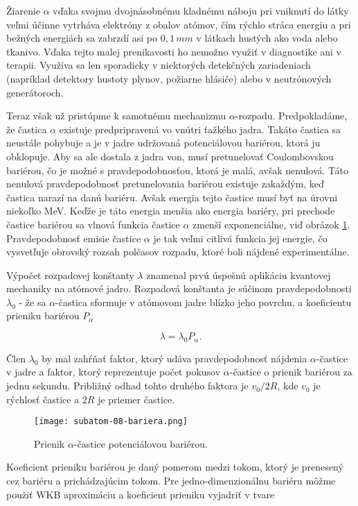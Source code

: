 \documentclass[../../main.tex]{subfiles}
\begin{document}
Žiarenie $\alpha$ vďaka svojmu dvojnásobnému kladnému náboju pri vniknutí do látky veľmi účinne vytrháva elektróny z obalov atómov, čím rýchlo stráca energiu a pri bežných energiách sa zabrzdí asi po $0,1\,\unit{mm}$ v látkach hustých ako voda alebo tkanivo. Vďaka tejto malej prenikavosti ho nemožno využiť v diagnostike ani v terapii. Využíva sa len sporadicky v niektorých detekčných zariadeniach (napríklad detektory hustoty plynov, požiarne hlásiče) alebo v neutrónových generátoroch.

Teraz však už pristúpme k samotnému mechanizmu $\alpha$-rozpadu. Predpokladáme, že častica $\alpha$ existuje predpripravená vo vnútri ťažkého jadra. Takáto častica sa neustále pohybuje a je v jadre udržovaná potenciálovou bariérou, ktorá ju obklopuje. Aby sa ale dostala z jadra von, musí pretunelovať Coulombovskou bariérou, čo je možné s pravdepodobnosťou, ktorá je malá, avšak nenulová. Táto nenulová pravdepodobnosť pretunelovania bariérou existuje zakaždým, keď častica narazí na danú bariéru. Avšak energia tejto častice musí byť na úrovni niekoľko MeV. Keďže je táto energia menšia ako energia bariéry, pri prechode častice bariérou sa vlnová funkcia častice $\alpha$ zmenší exponenciálne, viď obrázok \ref{sf8:fig:beriera}. Pravdepodobnosť emisie častice $\alpha$ je tak veľmi citlivá funkcia jej energie, čo vysvetľuje obrovský rozsah polčasov rozpadu, ktoré boli nájdené experimentálne.

Výpočet rozpadovej konštanty $\lambda$ znamenal prvú úspešnú aplikáciu kvantovej mechaniky na atómové jadro. Rozpadová konštanta je súčinom pravdepodobnosti $\lambda_0$ - že sa $\alpha$-častica sformuje v atómovom jadre blízko jeho povrchu, a koeficientu prieniku bariérou $P_{\alpha}$

$$ \lambda = \lambda_0 P_{\alpha}. $$

Člen $\lambda_0$ by mal zahŕňať faktor, ktorý udáva pravdepodobnosť nájdenia $\alpha$-častice v jadre a faktor, ktorý reprezentuje počet pokusov $\alpha$-častice o prienik bariérou za jednu sekundu. Približný odhad tohto druhého faktora je $v_0/2R$, kde $v_0$ je rýchlosť častice a $2R$ je priemer častice.

\begin{figure}[!h]
\texttt{[image: subatom-08-bariera.png]}
\centering
\caption{Prienik $\alpha$-častice potenciálovou bariérou.}
\label{sf8:fig:beriera}
\end{figure}

Koeficient prieniku bariérou je daný pomerom medzi tokom, ktorý je prenesený cez bariéru a prichádzajúcim tokom. Pre jedno-dimenzionálnu bariéru môžme použiť WKB aproximáciu a koeficient prieniku vyjadriť v tvare
\end{document}
